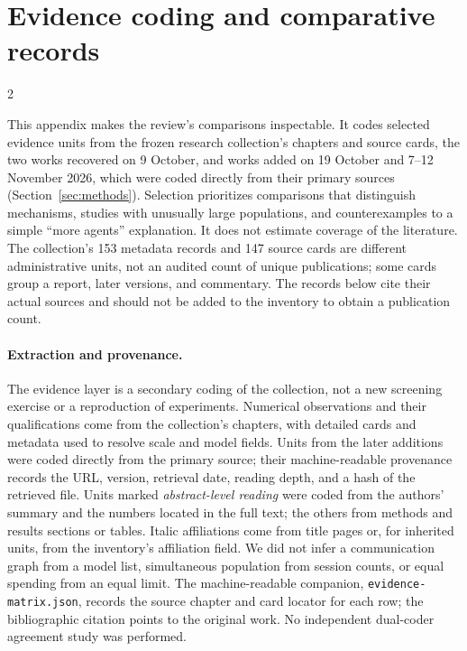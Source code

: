 
\clearpage
\onecolumn
\section{Evidence coding and comparative records}
\label{app:evidence}
\begin{multicols}{2}\raggedcolumns

This appendix makes the review's comparisons inspectable. It codes selected evidence units from the frozen research collection's chapters and source cards, the two works recovered on 9 October, and works added on 19 October and 7--12 November 2026, which were coded directly from their primary sources (Section~\ref{sec:methods}). Selection prioritizes comparisons that distinguish mechanisms, studies with unusually large populations, and counterexamples to a simple ``more agents'' explanation. It does not estimate coverage of the literature. The collection's 153 metadata records and 147 source cards are different administrative units, not an audited count of unique publications; some cards group a report, later versions, and commentary. The records below cite their actual sources and should not be added to the inventory to obtain a publication count.

\paragraph{Extraction and provenance.}
The evidence layer is a secondary coding of the collection, not a new screening exercise or a reproduction of experiments. Numerical observations and their qualifications come from the collection's chapters, with detailed cards and metadata used to resolve scale and model fields. Units from the later additions were coded directly from the primary source; their machine-readable provenance records the URL, version, retrieval date, reading depth, and a hash of the retrieved file. Units marked \emph{abstract-level reading} were coded from the authors' summary and the numbers located in the full text; the others from methods and results sections or tables. Italic affiliations come from title pages or, for inherited units, from the inventory's affiliation field. We did not infer a communication graph from a model list, simultaneous population from session counts, or equal spending from an equal limit. The machine-readable companion, \texttt{evidence-matrix.json}, records the source chapter and card locator for each row; the bibliographic citation points to the original work. No independent dual-coder agreement study was performed.


\end{multicols}
